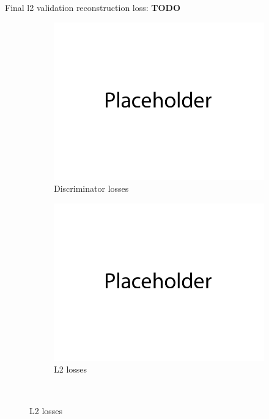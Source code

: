 \documentclass{article}
\begin{document}
Final l2 validation reconstruction loss: \textbf{TODO} \\
\begin{figure}[H]
    \centering
    \begin{subfigure}{0.45\textwidth}
        \centering
        \includegraphics[width=\textwidth]{figures/q3b_gan_losses.png}
        \caption{Discriminator losses}
    \end{subfigure}
    \begin{subfigure}{0.45\textwidth}
        \centering
        \includegraphics[width=\textwidth]{figures/q3b_l2_losses.png}
        \caption{L2 losses}
    \end{subfigure}
    \\

\end{figure}
\end{document}
